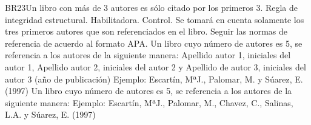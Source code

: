 \begin{BussinesRule}{BR23}{Un libro con más de 3 autores es sólo citado por los primeros 3.}
    \BRitem[Tipo:] Regla de integridad estructural.
    \BRitem[Clase:] Habilitadora.
    \BRitem[Nivel:] Control.
    \BRitem[Descripción:] Se tomará en cuenta solamente los tres primeros autores que son referenciados en el libro.
    \BRitem[Motivación:] Seguir las normas de referencia de acuerdo al formato APA.
     Un libro cuyo número de autores es 5, se referencia a los autores de la siguiente manera:
    Apellido autor 1, iniciales del autor 1, Apellido autor 2, iniciales del autor 2 y Apellido de autor 3, iniciales del autor 3 (año de publicación)
    Ejemplo: Escartín, MªJ., Palomar, M. y Súarez, E. (1997)
     Un libro cuyo número de autores es 5, se referencia a los autores de la siguiente manera:
    Ejemplo: Escartín, MªJ., Palomar, M., Chavez, C., Salinas, L.A. y Súarez, E. (1997)
\end{BussinesRule}
